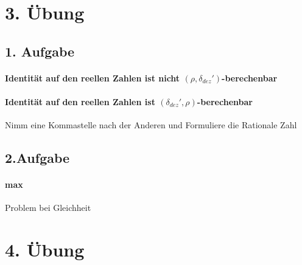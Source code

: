 \documentclass[ngerman]{scrartcl}
\begin{document}
\section{3. Übung}
\subsection*{1. Aufgabe}
\paragraph{Identität auf den reellen Zahlen ist nicht $ (\rho, \delta_{dez}') $-berechenbar}
\paragraph{Identität auf den reellen Zahlen ist $ (\delta_{dez}', \rho) $-berechenbar} Nimm eine Kommastelle nach der Anderen und Formuliere die Rationale Zahl

\subsection*{2.Aufgabe}
\paragraph{max} Problem bei Gleichheit


\section{4. Übung}
\end{document}
